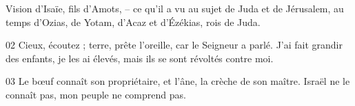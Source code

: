 Vision d’Isaïe, fils d’Amots, – ce qu’il a vu au sujet de Juda et de Jérusalem, au temps d’Ozias, de Yotam, d’Acaz et d’Ézékias, rois de Juda.

02 Cieux, écoutez ; terre, prête l’oreille, car le Seigneur a parlé. J’ai fait grandir des enfants, je les ai élevés, mais ils se sont révoltés contre moi.

03 Le bœuf connaît son propriétaire, et l’âne, la crèche de son maître. Israël ne le connaît pas, mon peuple ne comprend pas.
